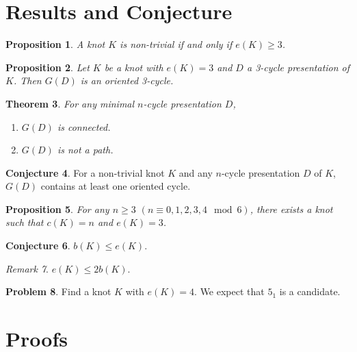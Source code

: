 \documentclass{amsart}
\newtheorem{theorem}{Theorem}[section]
\newtheorem{proposition}[theorem]{Proposition}
\theoremstyle{definition}
\newtheorem{conjecture}[theorem]{Conjecture}
\newtheorem{problem}[theorem]{Problem}
\theoremstyle{remark}
\newtheorem{remark}[theorem]{Remark}
\numberwithin{equation}{section}
\begin{document}
\section{Results and Conjecture}

\begin{proposition}\label{non-trivial}
A knot $K$ is non-trivial if and only if $e(K)\ge 3$.
\end{proposition}

\begin{proposition}\label{3-cycle}
Let $K$ be a knot with $e(K)=3$ and $D$ a 3-cycle presentation of $K$.
Then $G(D)$ is an oriented 3-cycle.
\end{proposition}

\begin{theorem}\label{main}
For any minimal $n$-cycle presentation $D$,
\begin{enumerate}
\item $G(D)$ is connected.
\item $G(D)$ is not a path.
\end{enumerate}
\end{theorem}

\begin{conjecture}
For a non-trivial knot $K$ and any $n$-cycle presentation $D$ of $K$, $G(D)$ contains at least one oriented cycle.
\end{conjecture}

\begin{proposition}\label{exist}
For any $n\ge 3$ $(n\equiv 0, 1, 2, 3, 4\mod 6)$, there exists a knot such that $c(K)=n$ and $e(K)=3$.
\end{proposition}

\begin{conjecture}\label{bridge}
$b(K)\le e(K)$.
\end{conjecture}

\begin{remark}
$e(K)\le 2b(K)$.
\end{remark}

\begin{problem}
Find a knot $K$ with $e(K)=4$.
We expect that $5_1$ is a candidate.
\end{problem}

\section{Proofs}
\end{document}
